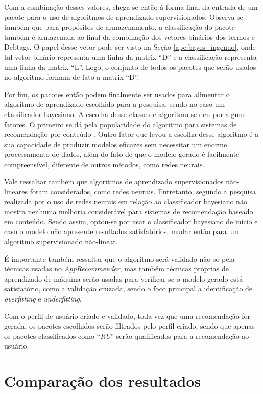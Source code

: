 Com a combinação desses valores, chega-se então à forma final da entrada de um pacote para o uso de algoritmos de aprendizado
supervisionados. Observa-se também que para propósitos de armazenamento, a classificação do pacote também é armazenada ao final da combinação
dos vetores binários dos termos e Debtags. O papel desse vetor pode ser visto na
Seção \ref{ape:bayes_ingenuo}, onde tal vetor binário representa uma linha da
matrix ``D'' e a classificação representa uma linha da matrix ``L''. Logo, o
conjunto de todos os pacotes que serão usados no algoritmo formam de fato a
matrix ``D''.

Por fim, os pacotes então podem finalmente ser usados para alimentar o algoritmo de aprendizado escolhido para a pesquisa, sendo no caso um
classificador bayesiano. A escolha desse classe de algoritmo se deu por alguns fatores. O primeiro se dá pela popularidade do algoritmo para
sistemas de recomendação por conteúdo \cite{amatriain2011data}. Outro fator que levou a escolha desse algoritmo é a sua capacidade de produzir
modelos eficazes sem necessitar um enorme processamento de dados, além do fato
de que o modelo gerado é facilmente compreensível, diferente de outros métodos,
como redes neurais\cite{segaran2007programming}.

Vale ressaltar também que algoritmos de aprendizado supervisionados não-lineares foram considerados, como redes neurais. Entretanto, segundo
a pesquisa realizada por \cite{pazzani1997learning} o uso de redes neurais em relação ao classificador bayesiano não mostra nenhuma melhoria
considerável para sistemas de recomendação baseado em conteúdo. Sendo assim, optou-se por usar o
classificador bayesiano de início e caso o modelo não apresente
resultados satisfatórios, mudar então para um algoritmo supervisionado não-linear.

É importante também ressaltar que o algoritmo será validado não só pela técnicas
usadas no \textit{AppRecommender}, mas também técnicas próprias de
aprendizado de máquina serão usadas para verificar se o modelo gerado está
satisfatório, como a validação cruzada, sendo o foco principal a
identificação de \textit{overfitting} e \textit{underfitting}.

Com o perfil de usuário criado e validado, toda vez que uma recomendação for gerada, os pacotes escolhidos serão filtrados pelo perfil criado,
sendo que apenas os pacotes classificados como ``\textit{RU}'' serão qualificados para a recomendação ao usuário.

\section{Comparação dos resultados}

